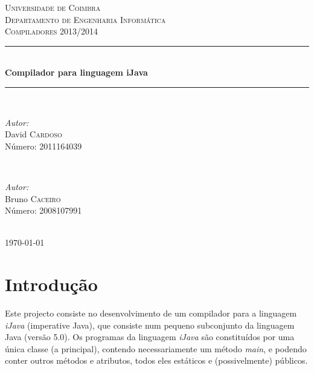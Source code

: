 \documentclass[12pt]{article}
\begin{document}
\renewcommand*\contentsname{Índice}

\begin{titlepage}

\newcommand{\HRule}{\rule{\linewidth}{0.5mm}} 
\center 
 

\textsc{\LARGE Universidade de Coimbra}\\[1.5cm] %
\textsc{\Large Departamento de Engenharia Informática}\\[4cm] %
\textsc{\large Compiladores 2013/2014}\\[1cm] %


\HRule \\[0.5cm]
{ \huge \bfseries Compilador para linguagem iJava}\\[0.4cm] 
\HRule \\[8cm]
 
\begin{minipage}{0.4\textwidth}
\begin{flushleft} \large
\emph{Autor:}\\
David \textsc{Cardoso}  \\Número: 2011164039
\end{flushleft}
\end{minipage}
~
\begin{minipage}{0.4\textwidth}
\begin{flushright} \large
\emph{Autor:} \\
Bruno \textsc{Caceiro}  \\Número: 2008107991
\end{flushright}
\end{minipage}\\[2cm]

{\large \today}\\[3cm]

\vfill

\end{titlepage}


\tableofcontents
\vfill
\pagebreak


\section{Introdução}
Este projecto consiste no desenvolvimento de um compilador para a linguagem \emph{iJava} (imperative Java), que consiste num pequeno subconjunto da linguagem Java (versão 5.0). Os programas da linguagem \emph{iJava} são constituídos por uma única classe (a principal), contendo necessariamente um método \emph{main}, e podendo conter outros métodos e atributos, todos eles estáticos e (possivelmente) públicos.
\end{document}
